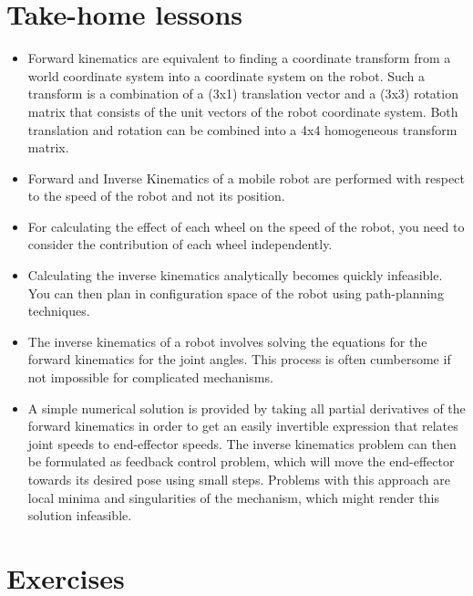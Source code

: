 
\section*{Take-home lessons}

\begin{itemize}
\item Forward kinematics are equivalent to finding a coordinate transform from a world coordinate system into a coordinate system on the robot. Such a transform is a combination of a (3x1) translation vector and a (3x3) rotation matrix that consists of the unit vectors of the robot coordinate system. Both translation and rotation can be combined into a 4x4 homogeneous transform matrix.
\item Forward and Inverse Kinematics of a mobile robot are performed with respect to the speed of the robot and not its position.
\item For calculating the effect of each wheel on the speed of the robot, you need to consider the contribution of each wheel independently.
\item Calculating the inverse kinematics analytically becomes quickly infeasible. You can then plan in configuration space of the robot using path-planning techniques.
\item The inverse kinematics of a robot involves solving the equations for the forward kinematics for the joint angles. This process is often cumbersome if not impossible for complicated mechanisms.
\item A simple numerical solution is provided by taking all partial derivatives of the forward kinematics in order to get an easily invertible expression that relates joint speeds to end-effector speeds.
The inverse kinematics problem can then be formulated as feedback control problem, which will move the end-effector towards its desired pose using small steps. Problems with this approach are local minima and singularities of the mechanism, which might render this solution infeasible.
\end{itemize}

\section*{Exercises}\small

